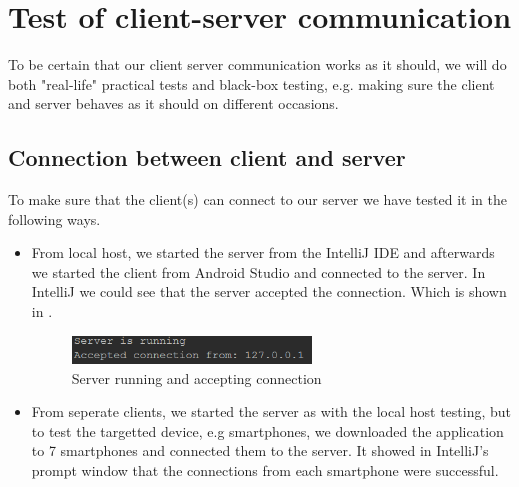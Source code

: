 \section{Test of client-server communication}
To be certain that our client server communication works as it should, we will do both "real-life" practical tests and black-box testing, e.g. making sure the client and server behaves as it should on different occasions.

\subsection{Connection between client and server}
To make sure that the client(s) can connect to our server we have tested it in the following ways.
\begin{itemize}
	\item From local host, we started the server from the IntelliJ IDE and afterwards we started the client from Android Studio and connected to the server. In IntelliJ we could see that the server accepted the connection. Which is shown in .
		\begin{figure}[h!]
  \centering
	    \includegraphics[width=0.6\textwidth]{figures/serverrunning.png}
    \caption{Server running and accepting connection}
    \label{fig:serverrunning}
\end{figure}
	\item From seperate clients, we started the server as with the local host testing, but to test the targetted device, e.g smartphones, we downloaded the application to 7 smartphones and connected them to the server. It showed in IntelliJ's prompt window that the connections from each smartphone were successful.
\end{itemize}

